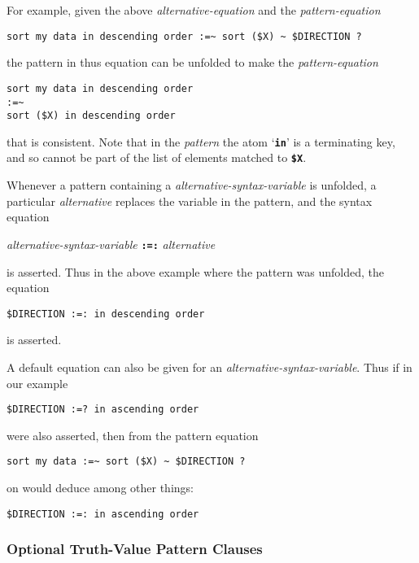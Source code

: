 \documentclass[12pt]{article}
\newcommand{\TT}[1]{{\tt \bfseries #1}}
\begin{document}
For example, given the above {\em alternative-equation} and the
{\em pattern-equation}
\begin{center}
\verb/sort my data in descending order :=~ sort ($X) ~ $DIRECTION ?/
\end{center}
the pattern in thus equation can be unfolded to make the {\em pattern-equation}
\begin{center}
\verb/sort my data in descending order/ \\
\verb/:=~ / \\
\verb/sort ($X) in descending order/
\end{center}

that is consistent.  Note that in the {\em pattern} the atom
`\TT{in}' is a terminating key, and so
cannot be part of the list of elements matched to \TT{\$X}.

Whenever a pattern containing a {\em alternative-syntax-variable}
is unfolded, a particular {\em alternative} replaces the
variable in the pattern, and the syntax equation
\begin{center}
{\em alternative-syntax-variable} \TT{:=:} {\em alternative}
\end{center}
is asserted.  Thus in the above
example where the pattern was unfolded, the equation
\begin{center}
\verb/$DIRECTION :=: in descending order/
\end{center}
is asserted.

A default equation can also be given for an {\em alternative-syntax-variable}.
Thus if in our example
\begin{center}
\verb/$DIRECTION :=? in ascending order/
\end{center}
were also asserted, then from the pattern equation
\begin{center}
\verb/sort my data :=~ sort ($X) ~ $DIRECTION ?/
\end{center}
on would deduce among other things:

\begin{center}
\verb/$DIRECTION :=: in ascending order/
\end{center}



\subsubsection{Optional Truth-Value Pattern Clauses}
\label{OPTIONAL-TRUTH-VALUE-PATTERN-CLAUSES}
\end{document}
